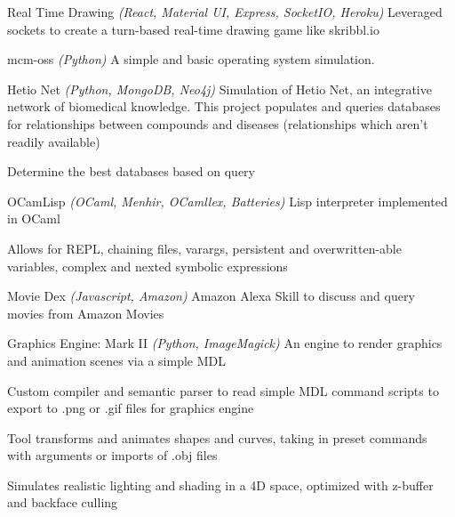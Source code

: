 \begin{cventries}
\cventryproject
    {Real Time Drawing} %
    {\emph{(React, Material UI, Express, SocketIO, Heroku)}}
    {} %
    {Leveraged sockets to create a turn-based real-time drawing game like skribbl.io} %
    {}

\cventryproject
    {mcm-oss} %
    {\emph{(Python)}}
    {} %
    {A simple and basic operating system simulation.} %
    {}

\cventryproject
    {Hetio Net} %
    {\emph{(Python, MongoDB, Neo4j)}}
    {} %
    {Simulation of Hetio Net, an integrative network of biomedical knowledge. This project populates and queries databases for relationships between compounds and diseases (relationships which aren’t readily available)} %
    {
      \begin{cvitems} %
        \item {Determine the best databases based on query}
      \end{cvitems}
    }

\cventryproject
    {OCamLisp} %
    {\emph{(OCaml, Menhir, OCamllex, Batteries)}}
    {} %
    {Lisp interpreter implemented in OCaml} %
    {
      \begin{cvitems} %
        \item {Allows for REPL, chaining files, varargs, persistent and overwritten-able variables, complex and nexted symbolic expressions}
      \end{cvitems}
    }

\cventryproject
    {Movie Dex} %
    {\emph{(Javascript, Amazon)}}
    {} %
    {Amazon Alexa Skill to discuss and query movies from Amazon Movies} %
    {}

\cventryproject
    {Graphics Engine: Mark II} %
    {\emph{(Python, ImageMagick)}}
    {} %
    {An engine to render graphics and animation scenes via a simple MDL} %
    {
      \begin{cvitems} %
        \item {Custom compiler and semantic parser to read simple MDL command scripts to export to .png or .gif files for graphics engine}
        \item {Tool transforms and animates shapes and curves, taking in preset commands with arguments or imports of .obj files}
        \item {Simulates realistic lighting and shading in a 4D space, optimized with z-buffer and backface culling}
      \end{cvitems}
    }


\end{cventries}

